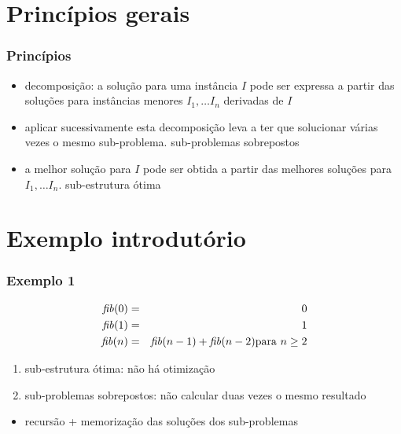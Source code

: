 \documentclass{beamer}
\begin{document}
\section{Princípios gerais}


\begin{frame}
\frametitle{Princípios}

\begin{itemize}
\item decomposição: a solução para uma instância $I$ pode ser expressa a partir
  das soluções para instâncias menores $I_1, \ldots I_n$ derivadas de $I$
\item aplicar sucessivamente esta decomposição leva a ter que solucionar várias
  vezes o mesmo sub-problema. \alert{sub-problemas sobrepostos}
\item a melhor solução para $I$ pode ser obtida a partir das melhores
  soluções para $I_1, \ldots I_n$. \alert{sub-estrutura ótima}
\end{itemize}

\end{frame}

\section{Exemplo introdutório}

\begin{frame}

\frametitle{Exemplo 1}

\begin{eqnarray*}
\id{fib}(0) & = & 0 \\
\id{fib}(1) & = & 1 \\
\id{fib}(n) & = & \id{fib}(n-1) + \id{fib}(n-2) \text{para $n \ge 2$}
\end{eqnarray*}

\begin{enumerate}
\item sub-estrutura ótima: não há otimização
\item sub-problemas sobrepostos: não calcular duas vezes o mesmo resultado
\end{enumerate}

\begin{itemize}
\item recursão + memorização das soluções dos sub-problemas
\end{itemize}

\end{frame}
\end{document}

